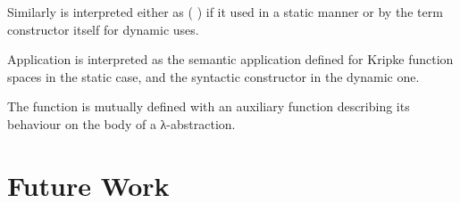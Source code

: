 \documentclass{article}
\begin{document}

Similarly  is interpreted either as ( \AF{+}\AS{\_})
if it used in a static manner or by the term constructor itself
for dynamic uses.


Application is interpreted as the semantic application defined
for Kripke function spaces in the static case, and the syntactic
 constructor in the dynamic one.







\begin{AgdaSuppressSpace}
\end{AgdaSuppressSpace}

The function  is mutually defined with an auxiliary
function describing its behaviour on the body of a λ-abstraction.

\begin{AgdaSuppressSpace}
\end{AgdaSuppressSpace}



\section{Future Work}

\cite{DBLP:journals/lisp/Coquand02}

\newpage
\printbibliography
\end{document}
